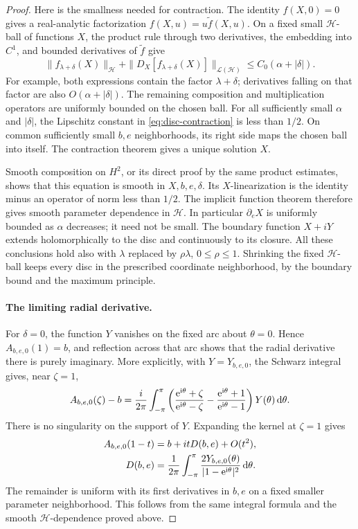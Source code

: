 \begin{proof}
Here is the smallness needed for contraction.  The identity $f(X,0)=0$ gives a real-analytic factorization $f(X,u)=u\widetilde f(X,u)$.  On a fixed small $\mathcal{H}$-ball of functions $X$, the product rule through two derivatives, the embedding into $C^1$, and bounded derivatives of $\widetilde f$ give
\begin{equation}\label{eq:disc-composition-bound}
 \|f_{\lambda+\delta}(X)\|_{\mathcal{H}}
 +\|D_X[f_{\lambda+\delta}(X)]\|_{\mathcal{L}(\mathcal{H})}
 \le C_0(\alpha+|\delta|).
\end{equation}
For example, both expressions contain the factor $\lambda+\delta$; derivatives falling on that factor are also $O(\alpha+|\delta|)$. The remaining composition and multiplication operators are uniformly bounded on the chosen ball.  For all sufficiently small $\alpha$ and $|\delta|$, the Lipschitz constant in \eqref{eq:disc-contraction} is less than $1/2$.  On common sufficiently small $b,e$ neighborhoods, its right side maps the chosen ball into itself.  The contraction theorem gives a unique solution $X$.

Smooth composition on $H^2$, or its direct proof by the same product estimates, shows that this equation is smooth in $X,b,e,\delta$. Its $X$-linearization is the identity minus an operator of norm less than $1/2$.  The implicit function theorem therefore gives smooth parameter dependence in $\mathcal{H}$.  In particular $\partial_e X$ is uniformly bounded as $\alpha$ decreases; it need not be small. The boundary function $X+iY$ extends holomorphically to the disc and continuously to its closure.  All these conclusions hold also with $\lambda$ replaced by $\rho\lambda$, $0\le\rho\le1$.  Shrinking the fixed $\mathcal{H}$-ball keeps every disc in the prescribed coordinate neighborhood, by the boundary bound and the maximum principle.

\paragraph{The limiting radial derivative.}
For $\delta=0$, the function $Y$ vanishes on the fixed arc about $\theta=0$.  Hence $A_{b,e,0}(1)=b$, and reflection across that arc shows that the radial derivative there is purely imaginary.  More explicitly, with $Y=Y_{b,e,0}$, the Schwarz integral gives, near $\zeta=1$,
\[
 A_{b,e,0}(\zeta)-b
 =\frac{i}{2\pi}\int_{-\pi}^{\pi}
 \left(\frac{\mathrm{e}^{\mathrm{i}\theta}+\zeta}{\mathrm{e}^{\mathrm{i}\theta}-\zeta}
       -\frac{\mathrm{e}^{\mathrm{i}\theta}+1}{\mathrm{e}^{\mathrm{i}\theta}-1}\right)
 Y(\theta)\,\mathrm{d} \theta.
\]
There is no singularity on the support of $Y$.  Expanding the kernel at $\zeta=1$ gives
\begin{align}
 A_{b,e,0}(1-t)
   &=b+i t D(b,e)+O(t^2),\label{eq:disc-radial}\\
 D(b,e)
   &=\frac{1}{2\pi}\int_{-\pi}^{\pi}
        \frac{2Y_{b,e,0}(\theta)}{|1-\mathrm{e}^{\mathrm{i}\theta}|^2}\,\mathrm{d} \theta.
        \label{eq:disc-normal-derivative}
\end{align}
The remainder is uniform with its first derivatives in $b,e$ on a fixed smaller parameter neighborhood.  This follows from the same integral formula and the smooth $\mathcal{H}$-dependence proved above.


\end{proof}
